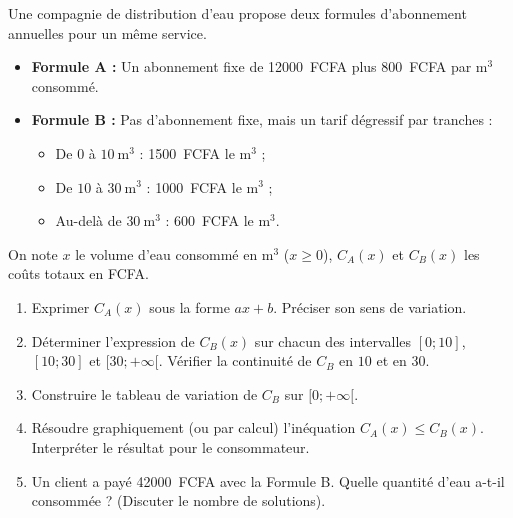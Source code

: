 \documentclass[11pt]{article}
\begin{document}
\begin{exercice}
Une compagnie de distribution d'eau propose deux formules d'abonnement annuelles pour un même service.
\begin{itemize}
    \item \textbf{Formule A :} Un abonnement fixe de \SI{12000}{FCFA} plus \SI{800}{FCFA} par $\text{m}^3$ consommé.
    \item \textbf{Formule B :} Pas d'abonnement fixe, mais un tarif dégressif par tranches :
    \begin{itemize}
        \item De $0$ à $10~\text{m}^3$ : \SI{1500}{FCFA} le $\text{m}^3$ ;
        \item De $10$ à $30~\text{m}^3$ : \SI{1000}{FCFA} le $\text{m}^3$ ;
        \item Au-delà de $30~\text{m}^3$ : \SI{600}{FCFA} le $\text{m}^3$.
    \end{itemize}
\end{itemize}
On note $x$ le volume d'eau consommé en $\text{m}^3$ ($x \ge 0$), $C_A(x)$ et $C_B(x)$ les coûts totaux en FCFA.
\begin{enumerate}
    \item Exprimer $C_A(x)$ sous la forme $ax+b$. Préciser son sens de variation.
    \item Déterminer l'expression de $C_B(x)$ sur chacun des intervalles $[0;10]$, $[10;30]$ et $[30;+\infty[$. Vérifier la continuité de $C_B$ en $10$ et en $30$.
    \item Construire le tableau de variation de $C_B$ sur $[0;+\infty[$.
    \item Résoudre graphiquement (ou par calcul) l'inéquation $C_A(x) \le C_B(x)$. Interpréter le résultat pour le consommateur.
    \item Un client a payé \SI{42000}{FCFA} avec la Formule B. Quelle quantité d'eau a-t-il consommée ? (Discuter le nombre de solutions).
\end{enumerate}
\end{exercice}
\end{document}
